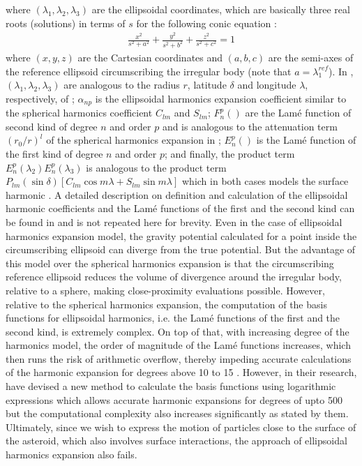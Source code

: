 where $(\lambda_1, \lambda_2, \lambda_3)$ are the ellipsoidal coordinates, which are basically three real roots (solutions) in terms of $s$ for the following conic equation \parencite{garmier2002modeling}:
\begin{align}
    \frac{x^2}{s^2 + a^2} + \frac{y^2}{s^2 + b^2} + \frac{z^2}{s^2 + c^2} = 1
    \label{eqn:conic_ellipsoidal}
\end{align}
where $(x, y, z)$ are the Cartesian coordinates and $(a, b, c)$ are the semi-axes of the reference ellipsoid circumscribing the irregular body (note that $a=\lambda_1^{ref}$). In , $(\lambda_1, \lambda_2, \lambda_3)$ are analogous to the radius $r$, latitude $\delta$ and longitude $\lambda$, respectively, of ; $\alpha_{np}$ is the ellipsoidal harmonics expansion coefficient similar to the spherical harmonics coefficient $C_{lm}$ and $S_{lm}$; $F_n^p()$ are the Lam\'e function of second kind of degree $n$ and order $p$ and is analogous to the attenuation term $(r_0 / r)^l$ of the spherical harmonics expansion in ; $E_{n}^p()$ is the Lam\'e function of the first kind of degree $n$ and order $p$; and finally, the product term $E_{n}^p(\lambda_2)E_{n}^p(\lambda_3)$ is analogous to the product term $P_{lm} (\sin\delta) [C_{lm}\cos m\lambda + S_{lm}\sin m\lambda]$ which in both cases models the surface harmonic \parencite{garmier2002modeling}. A detailed description on definition and calculation of the ellipsoidal harmonic coefficients and the Lam\'e functions of the first and the second kind can be found in \cite{dechambre2002transformation} and is not repeated here for brevity.
%
\newline\newline
%
Even in the case of ellipsoidal harmonics expansion model, the gravity potential calculated for a point inside the circumscribing ellipsoid can diverge from the true potential. But the advantage of this model over the spherical harmonics expansion is that the circumscribing reference ellipsoid reduces the volume of divergence around the irregular body, relative to a sphere, making close-proximity evaluations possible. However, relative to the spherical harmonics expansion, the computation of the basis functions for ellipsoidal harmonics, i.e. the Lam\'e functions of the first and the second kind, is extremely complex. On top of that, with increasing degree of the harmonics model, the order of magnitude of the Lam\'e functions increases, which then runs the risk of arithmetic overflow, thereby impeding accurate calculations of the harmonic expansion for degrees above 10 to 15 \parencite{reimond2016spheroidal}. However, in their research, \cite{reimond2016spheroidal} have devised a new method to calculate the basis functions using logarithmic expressions which allows accurate harmonic expansions for degrees of upto 500 but the computational complexity also increases significantly as stated by them. Ultimately, since we wish to express the motion of particles close to the surface of the asteroid, which also involves surface interactions, the approach of ellipsoidal harmonics expansion also fails.

